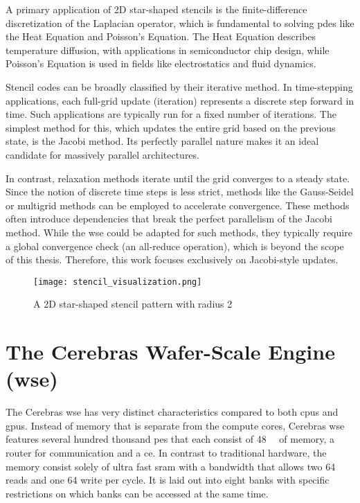 A primary application of 2D star-shaped stencils is the finite-difference discretization of the Laplacian operator, which is fundamental to solving \acp{pde} like the Heat Equation and Poisson's Equation. The Heat Equation describes temperature diffusion, with applications in semiconductor chip design, while Poisson's Equation is used in fields like electrostatics and fluid dynamics.

Stencil codes can be broadly classified by their iterative method. In time-stepping applications, each full-grid update (iteration) represents a discrete step forward in time. Such applications are typically run for a fixed number of iterations. The simplest method for this, which updates the entire grid based on the previous state, is the Jacobi method. Its perfectly parallel nature makes it an ideal candidate for massively parallel architectures.

In contrast, relaxation methods iterate until the grid converges to a steady state. Since the notion of discrete time steps is less strict, methods like the Gauss-Seidel or multigrid methods can be employed to accelerate convergence. These methods often introduce dependencies that break the perfect parallelism of the Jacobi method. While the \ac{wse} could be adapted for such methods, they typically require a global convergence check (an all-reduce operation), which is beyond the scope of this thesis. Therefore, this work focuses exclusively on Jacobi-style updates.

\begin{figure}[h]
    \centering
    \texttt{[image: stencil\_visualization.png]}
    \caption{A 2D star-shaped stencil pattern with radius 2}
    \label{fig:stencil_visualization}
\end{figure}

\section{The Cerebras Wafer-Scale Engine (\ac{wse})}
The Cerebras \ac{wse} has very distinct characteristics compared to both \acp{cpu} and \acp{gpu}.
Instead of memory that is separate from the compute cores, Cerebras \ac{wse} features several hundred thousand \acp{pe} that each consist of \qty{48}{\kilo\byte} of memory, a router for communication and a \ac{ce}. In contrast to traditional hardware, the memory consist solely of ultra fast \ac{sram} with a bandwidth that allows two \qty{64}{\bit} reads and one \qty{64}{\bit} write per cycle. It is laid out into eight banks with specific restrictions on which banks can be accessed at the same time.

